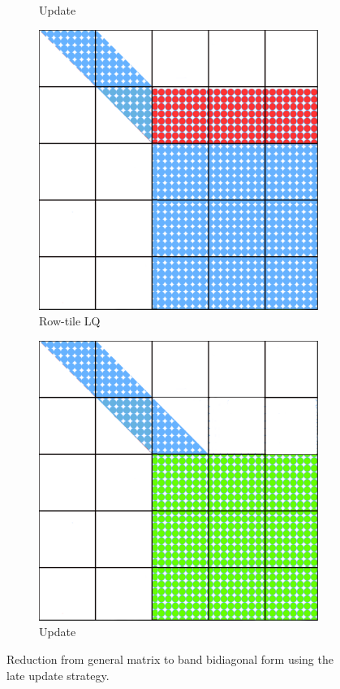 \begin{figure}[h!]
\begin{subfigure}[t]{0.2 \textwidth}
      \caption{\label{fig:qr_update_2}Update}
    \end{subfigure}
    \hfill
    \begin{subfigure}[t]{0.2 \textwidth}
      \includegraphics[width=\textwidth]{fig/SVD_panel_7_grid}
      \caption{\label{fig:lq_2}Row-tile LQ}
    \end{subfigure}
    \hfill
    \begin{subfigure}[t]{0.2 \textwidth}
      \includegraphics[width=\textwidth]{fig/SVD_panel_8_grid}
      \caption{\label{fig:lq_update_2}Update}
    \end{subfigure}
    \caption{Reduction from general matrix to band bidiagonal form
      using the late update strategy.
    \label{fig:panel}}
\end{figure}

